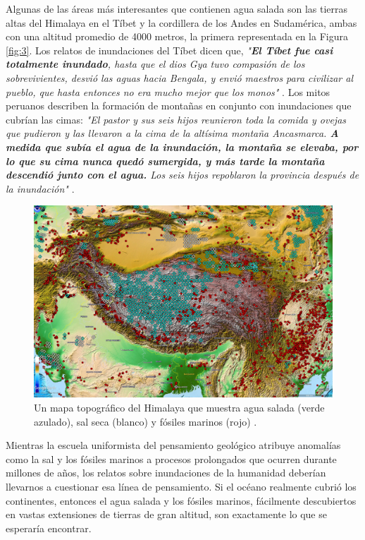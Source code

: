 \documentclass[10pt,twocolumn,letterpaper]{article}
\begin{document}
Algunas de las áreas más interesantes que contienen agua salada son las tierras altas del Himalaya en el Tíbet y la cordillera de los Andes en Sudamérica, ambas con una altitud promedio de 4000 metros, la primera representada en la Figura \ref{fig:3}. Los relatos de inundaciones del Tíbet dicen que, \textit{"\textbf{El Tíbet fue casi totalmente inundado}, hasta que el dios Gya tuvo compasión de los sobrevivientes, desvió las aguas hacia Bengala, y envió maestros para civilizar al pueblo, que hasta entonces no era mucho mejor que los monos"} \cite{3}. Los mitos peruanos describen la formación de montañas en conjunto con inundaciones que cubrían las cimas: \textit{"El pastor y sus seis hijos reunieron toda la comida y ovejas que pudieron y las llevaron a la cima de la altísima montaña Ancasmarca. \textbf{A medida que subía el agua de la inundación, la montaña se elevaba, por lo que su cima nunca quedó sumergida, y más tarde la montaña descendió junto con el agua.} Los seis hijos repoblaron la provincia después de la inundación"} \cite{3}.

\begin{figure}[t]
\begin{center}
   \includegraphics[width=1\linewidth]{tibet.jpg}
\end{center}
   \caption{Un mapa topográfico del Himalaya que muestra agua salada (verde azulado), sal seca (blanco) y fósiles marinos (rojo) \cite{15,16,86,87}.}
\label{fig:3}
\label{fig:onecol}
\end{figure}

Mientras la escuela uniformista del pensamiento geológico atribuye anomalías como la sal y los fósiles marinos a procesos prolongados que ocurren durante millones de años, los relatos sobre inundaciones de la humanidad deberían llevarnos a cuestionar esa línea de pensamiento. Si el océano realmente cubrió los continentes, entonces el agua salada y los fósiles marinos, fácilmente descubiertos en vastas extensiones de tierras de gran altitud, son exactamente lo que se esperaría encontrar.
\end{document}
